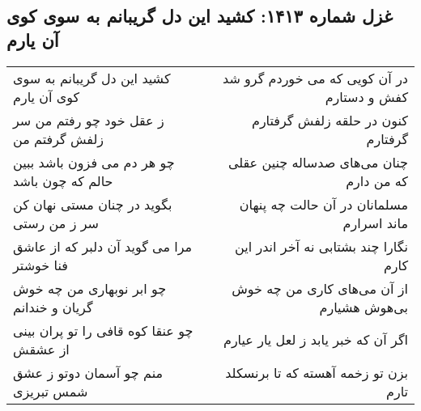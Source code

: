 \begin{center}
\section*{غزل شماره ۱۴۱۳: کشید این دل گریبانم به سوی کوی آن یارم}
\label{sec:1413}
\begin{longtable}{l p{0.5cm} r}
کشید این دل گریبانم به سوی کوی آن یارم
&&
در آن کویی که می خوردم گرو شد کفش و دستارم
\\
ز عقل خود چو رفتم من سر زلفش گرفتم من
&&
کنون در حلقه زلفش گرفتارم گرفتارم
\\
چو هر دم می فزون باشد ببین حالم که چون باشد
&&
چنان می‌های صدساله چنین عقلی که من دارم
\\
بگوید در چنان مستی نهان کن سر ز من رستی
&&
مسلمانان در آن حالت چه پنهان ماند اسرارم
\\
مرا می گوید آن دلبر که از عاشق فنا خوشتر
&&
نگارا چند بشتابی نه آخر اندر این کارم
\\
چو ابر نوبهاری من چه خوش گریان و خندانم
&&
از آن می‌های کاری من چه خوش بی‌هوش هشیارم
\\
چو عنقا کوه قافی را تو پران بینی از عشقش
&&
اگر آن که خبر یابد ز لعل یار عیارم
\\
منم چو آسمان دوتو ز عشق شمس تبریزی
&&
بزن تو زخمه آهسته که تا برنسکلد تارم
\\
\end{longtable}
\end{center}
